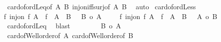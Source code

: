 \begin{isabellebody}
%
\isadelimproof
%
\endisadelimproof
%
\isatagproof
{}\isamarkupfalse%
\ card{\isacharunderscore}{\kern0pt}of{\isacharunderscore}{\kern0pt}ordLeq{\isacharbrackleft}{\kern0pt}of\ A\ B{\isacharbrackright}{\kern0pt}\ inj{\isacharunderscore}{\kern0pt}on{\isacharunderscore}{\kern0pt}iff{\isacharunderscore}{\kern0pt}surj{\isacharbrackleft}{\kern0pt}of\ A\ B{\isacharbrackright}{\kern0pt}\ \isamarkupfalse%
\ auto%
\endisatagproof
{\isafoldproof}%
%
\isadelimproof
\isanewline
%
\endisadelimproof
\isanewline
{}\isamarkupfalse%
\ card{\isacharunderscore}{\kern0pt}of{\isacharunderscore}{\kern0pt}ordLess{\isacharcolon}{\kern0pt}\isanewline
{\isachardoublequoteopen}{\isacharparenleft}{\kern0pt}{\isasymnot}{\isacharparenleft}{\kern0pt}{\isasymexists}f{\isachardot}{\kern0pt}\ inj{\isacharunderscore}{\kern0pt}on\ f\ A\ {\isasymand}\ f\ {\isacharbackquote}{\kern0pt}\ A\ {\isasymle}\ B{\isacharparenright}{\kern0pt}{\isacharparenright}{\kern0pt}\ {\isacharequal}{\kern0pt}\ {\isacharparenleft}{\kern0pt}\ {\isacharbar}{\kern0pt}B{\isacharbar}{\kern0pt}\ {\isacharless}{\kern0pt}o\ {\isacharbar}{\kern0pt}A{\isacharbar}{\kern0pt}\ {\isacharparenright}{\kern0pt}{\isachardoublequoteclose}\isanewline
%
\isadelimproof
%
\endisadelimproof
%
\isatagproof
{}\isamarkupfalse%
{\isacharminus}{\kern0pt}\isanewline
\ \ \isamarkupfalse%
\ {\isachardoublequoteopen}{\isacharparenleft}{\kern0pt}{\isasymnot}{\isacharparenleft}{\kern0pt}{\isasymexists}f{\isachardot}{\kern0pt}\ inj{\isacharunderscore}{\kern0pt}on\ f\ A\ {\isasymand}\ f\ {\isacharbackquote}{\kern0pt}\ A\ {\isasymle}\ B{\isacharparenright}{\kern0pt}{\isacharparenright}{\kern0pt}\ {\isacharequal}{\kern0pt}\ {\isacharparenleft}{\kern0pt}{\isasymnot}\ {\isacharbar}{\kern0pt}A{\isacharbar}{\kern0pt}\ {\isasymle}o\ {\isacharbar}{\kern0pt}B{\isacharbar}{\kern0pt}\ {\isacharparenright}{\kern0pt}{\isachardoublequoteclose}\isanewline
\ \ \isamarkupfalse%
\ card{\isacharunderscore}{\kern0pt}of{\isacharunderscore}{\kern0pt}ordLeq\ \isamarkupfalse%
\ blast\isanewline
\ \ \isamarkupfalse%
\ \isamarkupfalse%
\ {\isachardoublequoteopen}{\isasymdots}\ {\isacharequal}{\kern0pt}\ {\isacharparenleft}{\kern0pt}\ {\isacharbar}{\kern0pt}B{\isacharbar}{\kern0pt}\ {\isacharless}{\kern0pt}o\ {\isacharbar}{\kern0pt}A{\isacharbar}{\kern0pt}\ {\isacharparenright}{\kern0pt}{\isachardoublequoteclose}\isanewline
\ \ \isamarkupfalse%
\ card{\isacharunderscore}{\kern0pt}of{\isacharunderscore}{\kern0pt}Well{\isacharunderscore}{\kern0pt}order{\isacharbrackleft}{\kern0pt}of\ A{\isacharbrackright}{\kern0pt}\ card{\isacharunderscore}{\kern0pt}of{\isacharunderscore}{\kern0pt}Well{\isacharunderscore}{\kern0pt}order{\isacharbrackleft}{\kern0pt}of\ B{\isacharbrackright}{\kern0pt}\isanewline

\end{isabellebody}
